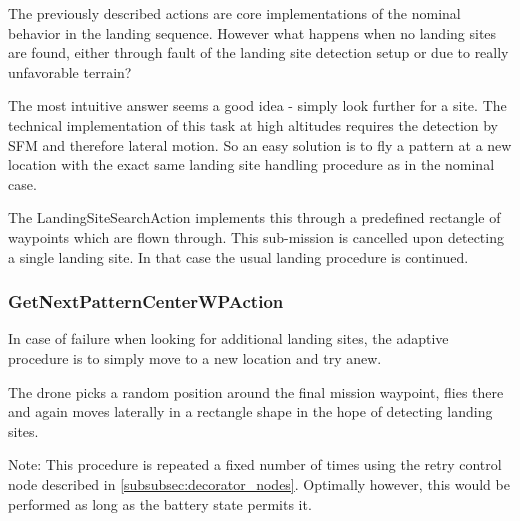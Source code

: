 The previously described actions are core implementations of the nominal behavior in the landing sequence. However what happens when no landing sites are found, either through fault of the landing site detection setup or due to really unfavorable terrain?

The most intuitive answer seems a good idea - simply look further for a site. The technical implementation of this task at high altitudes requires the detection by SFM and therefore lateral motion. So an easy solution is to fly a pattern at a new location with the exact same landing site handling procedure as in the nominal case.

The LandingSiteSearchAction implements this through a predefined rectangle of waypoints which are flown through. This sub-mission is cancelled upon detecting a single landing site. In that case the usual landing procedure is continued.

\subsubsection{GetNextPatternCenterWPAction}

In case of failure when looking for additional landing sites, the adaptive procedure is to simply move to a new location and try anew. 

The drone picks a random position around the final mission waypoint, flies there and again moves laterally in a rectangle shape in the hope of detecting landing sites.

Note: This procedure is repeated a fixed number of times using the retry control node described in \cref{subsubsec:decorator_nodes}. Optimally however, this would be performed as long as the battery state permits it. 

